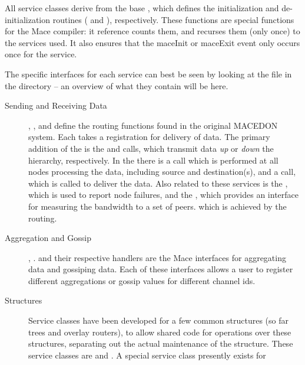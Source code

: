 All service classes derive from the base , which 
defines the initialization and de-initialization routines (
and ), respectively.  These functions are special functions
for the Mace compiler: it reference counts them, and recurses them (only once)
to the services used.  It also ensures that the maceInit or maceExit event
only occurs once for the service.

The specific interfaces for each service can best be seen by looking at the 
 file in the  directory -- an 
overview of what they contain will be here.

\begin{description}
\item [Sending and Receiving Data] , ,
  and  define the routing functions found
  in the original MACEDON system.  Each takes a  registration for 
  delivery of data.  The primary addition of the 
  is the  and  calls, which transmit data \emph{up} or 
  \emph{down} the hierarchy, respectively.  In the  there is a
   call which is performed at all nodes processing the data, including 
  source and destination(s), and a  call, which is called to deliver the data.
  Also related to these services is the , which is used to 
  report node failures, and the , which provides an 
  interface for measuring the bandwidth to a set of peers. which is achieved by the routing.
\item[Aggregation and Gossip] , .
  and their respective handlers are the Mace interfaces for aggregating data and gossiping data.
  Each of these interfaces allows a user to register different aggregations or gossip values for
  different channel ids.
\item[Structures] Service classes have been developed for a few common structures (so far trees
  and overlay routers), to allow shared code for operations over these structures,
  separating out the actual maintenance of the structure.  These service
  classes are  and
  .  A special service class presently exists for

\end{description}
